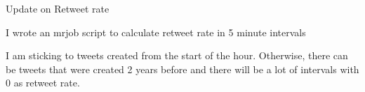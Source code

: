 Update on Retweet rate

I wrote an mrjob script to calculate retweet rate in 5 minute intervals

I am sticking to tweets created from the start of the hour. Otherwise,
there can be tweets that were created 2 years before and there will be a lot of
intervals with 0 as retweet rate.
